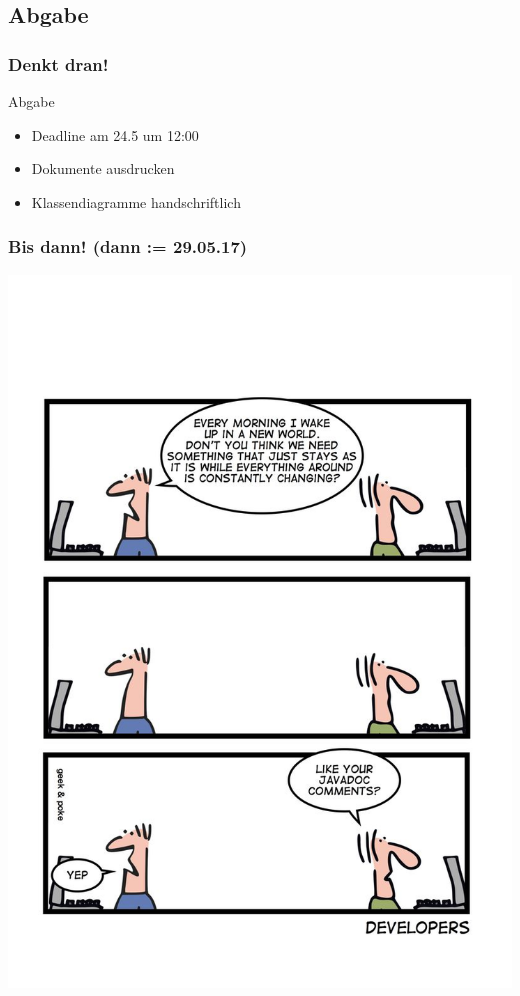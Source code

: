 \documentclass[18pt]{beamer}
\begin{document}
	\subsection{Abgabe}
	\begin{frame}
		\frametitle{Denkt dran!}
		\begin{alertblock}{Abgabe}
			\begin{itemize}
				\item Deadline am 24.5 um 12:00
				\item Dokumente ausdrucken
				\item Klassendiagramme handschriftlich
			\end{itemize}
		\end{alertblock}
	\end{frame}
		
	\begin{frame}
		\frametitle{Bis dann! (dann := 29.05.17)}
		\centering
		\includegraphics[scale=0.85]{./comics/geek_and_poke_javadoc.jpg}
	\end{frame}
\end{document}
